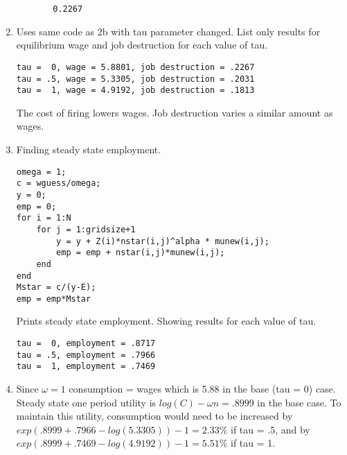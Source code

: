 \documentclass[12pt]{article}
\begin{document}
\begin{onehalfspace}
\begin{enumerate}[1.]
\begin{enumerate}
\begin{lstlisting}
    0.2267 
\end{lstlisting}
    \end{enumerate}
    
    
    \item Uses same code as 2b with tau parameter changed. List only results for equilibrium wage and job destruction for each value of tau.
\begin{lstlisting}
tau =  0, wage = 5.8801, job destruction = .2267
tau = .5, wage = 5.3305, job destruction = .2031
tau =  1, wage = 4.9192, job destruction = .1813
\end{lstlisting}
 
The cost of firing lowers wages. Job destruction varies a similar amount as wages.
    \item
    Finding steady state employment.
\begin{lstlisting}
omega = 1;
c = wguess/omega;
y = 0;
emp = 0;
for i = 1:N
    for j = 1:gridsize+1
        y = y + Z(i)*nstar(i,j)^alpha * munew(i,j);
        emp = emp + nstar(i,j)*munew(i,j);
    end
end
Mstar = c/(y-E);
emp = emp*Mstar
\end{lstlisting}
Prints steady state employment. Showing results for each value of tau.
\begin{lstlisting}
tau =  0, employment = .8717
tau = .5, employment = .7966
tau =  1, employment = .7469
\end{lstlisting}
    \item
    Since $\omega=1$ consumption = wages which is 5.88 in the base (tau = 0) case. Steady state one period utility is $log(C) - \omega n = .8999$  in the base case. To maintain this utility, consumption would need to be increased by $exp\left(.8999+.7966 - log(5.3305)\right)-1 = 2.33\%$ if tau = .5, and by $exp\left(.8999+.7469 - log(4.9192)\right)-1 = 5.51\%$ if tau = 1.
\end{enumerate}

\end{onehalfspace}
\end{document}
